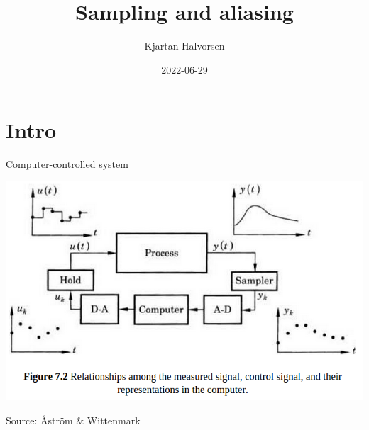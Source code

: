 \documentclass[presentation,aspectratio=169]{beamer}
\author{Kjartan Halvorsen}
\date{2022-06-29}
\title{Sampling and aliasing}
\begin{document}
\maketitle

\section{Intro}
\label{sec:orga4dcdd2}

\begin{frame}[label={sec:org129a739}]{Computer-controlled system}
\begin{center}
\includegraphics[width=0.7\linewidth]{../../figures/fig7-2.png}
\end{center}
{\footnotesize Source: Åström \& Wittenmark}
\end{frame}
\end{document}
